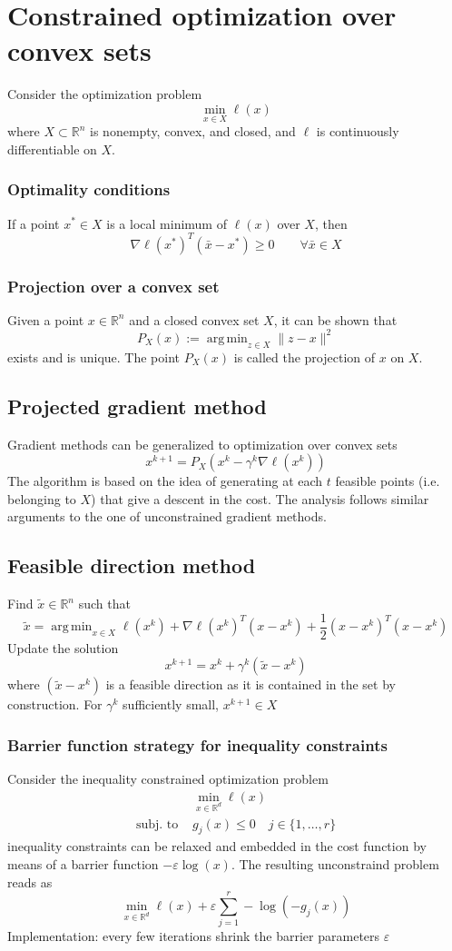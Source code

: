 \documentclass[openany]{book}
\DeclareMathOperator*{\argmin}{arg\,min} %
\newcommand{\R}{\mathbb{R}} %
\theoremstyle{definition}
\theoremstyle{remark}
\begin{document}
\section{Constrained optimization over convex sets}
Consider the optimization problem 
\[
    \min_{x\in X}\ell(x)
\]
where $X \subset \R^n$ is nonempty, convex, and closed, and $\ell$ is continuously differentiable on $X$. 
\subsubsection{Optimality conditions}
If a point $x^* \in X$ is a local minimum of $\ell(x)$ over $X$, then 
\[
    \nabla\ell(x^*)^T(\bar{x}-x^*)\geq 0 \qquad \forall\bar{x}\in X
\]
\subsubsection{Projection over a convex set}
Given a point $x\in\R^n$ and a closed convex set $X$, it can be shown that 
\[
    P_X(x) := \argmin_{z\in X}\|z-x\|^2
\]
exists and is unique. The point $P_X(x)$ is called the projection of $x$ on $X$.
\subsection{Projected gradient method}
Gradient methods can be generalized to optimization over convex sets 
\[
    x^{k+1}=P_X(x^k-\gamma^k\nabla\ell(x^k))
\]
The algorithm is based on the idea of generating at each $t$ feasible points (i.e. belonging to $X$) that give a descent in the cost. The analysis follows similar arguments to the one of unconstrained gradient methods.

\subsection{Feasible direction method}
Find $\tilde{x}\in\R^n$ such that 
\[
    \tilde{x} = \argmin_{x\in X} \ell(x^k)+\nabla\ell(x^k)^T(x-x^k)+\displaystyle\frac{1}{2}(x-x^k)^T(x-x^k)
\]
Update the solution 
\[
    x^{k+1}=x^k+\gamma^k(\tilde{x}-x^k)
\]
where $(\tilde{x}-x^k)$ is a feasible direction as it is contained in the set by construction. For $\gamma^k$ sufficiently small, $x^{k+1}\in X$

\subsubsection{Barrier function strategy for inequality constraints}
Consider the inequality constrained optimization problem 
\begin{align*}
    &\min_{x\in\R^d}\ell(x)\\
    \text{subj. to } &g_j(x)\leq 0 \quad j\in \{1,\dots,r\}
\end{align*}  
inequality constraints can be relaxed and embedded in the cost function by means of a barrier function $-\varepsilon \log(x)$. The resulting unconstraind problem reads as 
\[
    \min_{x\in\R^d} \ell(x) + \varepsilon \displaystyle\sum_{j=1}^{r}-\log(-g_j(x))
\]
Implementation: every few iterations shrink the barrier parameters $\varepsilon$
\end{document}

